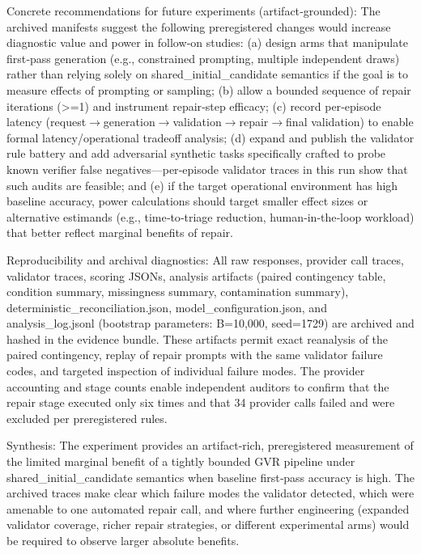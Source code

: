 \documentclass[conference]{IEEEtran}
\begin{document}
Concrete recommendations for future experiments (artifact‑grounded): The archived manifests suggest the following preregistered changes would increase diagnostic value and power in follow‑on studies: (a) design arms that manipulate first‑pass generation (e.g., constrained prompting, multiple independent draws) rather than relying solely on shared\_initial\_candidate semantics if the goal is to measure effects of prompting or sampling; (b) allow a bounded sequence of repair iterations (>=1) and instrument repair‑step efficacy; (c) record per‑episode latency (request\ensuremath{\rightarrow}generation\ensuremath{\rightarrow}validation\ensuremath{\rightarrow}repair\ensuremath{\rightarrow}final validation) to enable formal latency/operational tradeoff analysis; (d) expand and publish the validator rule battery and add adversarial synthetic tasks specifically crafted to probe known verifier false negatives---per‑episode validator traces in this run show that such audits are feasible; and (e) if the target operational environment has high baseline accuracy, power calculations should target smaller effect sizes or alternative estimands (e.g., time‑to‑triage reduction, human‑in‑the‑loop workload) that better reflect marginal benefits of repair.

Reproducibility and archival diagnostics: All raw responses, provider call traces, validator traces, scoring JSONs, analysis artifacts (paired contingency table, condition summary, missingness summary, contamination summary), deterministic\_reconciliation.json, model\_configuration.json, and analysis\_log.jsonl (bootstrap parameters: B=10,000, seed=1729) are archived and hashed in the evidence bundle. These artifacts permit exact reanalysis of the paired contingency, replay of repair prompts with the same validator failure codes, and targeted inspection of individual failure modes. The provider accounting and stage counts enable independent auditors to confirm that the repair stage executed only six times and that 34 provider calls failed and were excluded per preregistered rules.

Synthesis: The experiment provides an artifact‑rich, preregistered measurement of the limited marginal benefit of a tightly bounded GVR pipeline under shared\_initial\_candidate semantics when baseline first‑pass accuracy is high. The archived traces make clear which failure modes the validator detected, which were amenable to one automated repair call, and where further engineering (expanded validator coverage, richer repair strategies, or different experimental arms) would be required to observe larger absolute benefits.
\end{document}
